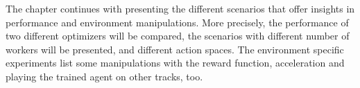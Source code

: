 The chapter continues with presenting the different scenarios that offer insights in performance and environment manipulations. More precisely, the performance of two different optimizers will be compared, the scenarios with different number of workers will be presented, and different action spaces. The environment specific experiments list some manipulations with the reward function, acceleration and playing the trained agent on other tracks, too.








